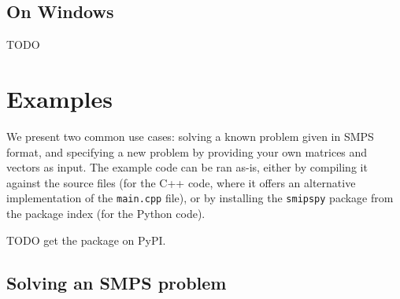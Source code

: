 \documentclass[12pt, english]{article}
\begin{document}
\subsection{On Windows}

TODO

\section{Examples}
\label{sec:examples}

We present two common use cases: solving a known problem given in SMPS format, and specifying a new problem by providing your own matrices and vectors as input. The example code can be ran as-is, either by compiling it against the source files (for the C++ code, where it offers an alternative implementation of the \texttt{main.cpp} file), or by installing the \texttt{smipspy} package from the package index (for the Python code).

TODO get the package on PyPI.  

\subsection{Solving an SMPS problem}
\label{subsec:solving_smps_example}
\end{document}
